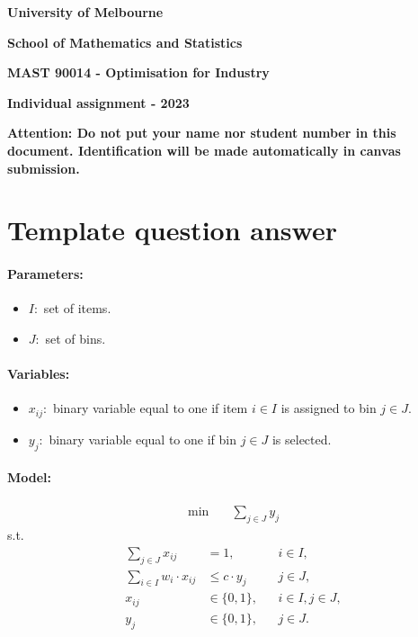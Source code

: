 \documentclass[12pt,a4paper]{article}
\begin{document}
{\large \bf University of Melbourne} 
\vspace{-0.4cm}

{\large \bf School of Mathematics and Statistics} 
\vspace{-0.4cm}

{\large \bf MAST 90014 - Optimisation for Industry}

{\large \bf Individual assignment - 2023}


{\bf Attention: Do not put your name nor student number in this document. Identification will be made automatically in canvas submission.}


\section*{Template question answer}



\paragraph{Parameters:}


\begin{itemize}
\item[] $I:$ set of items.
\item[] $J:$ set of bins.
\end{itemize}


\paragraph{Variables:}


\begin{itemize}
\item[] $x_{ij}:$ binary variable equal to one if item $i \in I$ is assigned to bin $j \in J$.
\item[] $y_{j}:$ binary variable equal to one if bin $j\in J$ is selected.
\end{itemize}


\paragraph{Model:}

\begin{align}
\min \quad
& \sum_{j\in J} y_j \label{objective}
\end{align}
s.t.
\begin{align}
\sum_{j \in J} x_{ij}  &= 1, && i \in I, \label{c1} \\
\sum_{i \in I} w_i \cdot x_{ij} &\leq c\cdot y_j  && j \in J, \label{c2} \\
 x_{ij} & \in \{0,1\},  && i \in I, j\in J, \label{c3}\\
 y_{j} & \in \{0,1\},  && j\in J. \label{c4}
\end{align}
\end{document}
